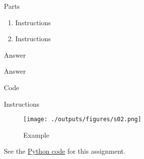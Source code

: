 


%
%

\newcommand{\hmwkTitle}{HW00}
\newcommand{\hmwkSubTitle}{Homework Template}
\newcommand{\hmwkDueDate}{September 25th. 2025}
\newcommand{\hmwkDueTime}{09:30 AM}
\newcommand{\hmwkClass}{ENAE 441 - 0101}
\newcommand{\hmwkClassTime}{09:30 AM}
\newcommand{\hmwkClassInstructor}{Dr. Martin}
\newcommand{\hmwkAuthorName}{\textbf{Vai Srivastava}}
\newcommand{\hmwkCompletionDate}{\today}



\maketitle

\pagebreak

\begin{hwkProblem}{1}{Parts} \label{hwk:p01}

	\begin{enumerate}[label=(\alph*)]
		\item \label{hwk:p01a} Instructions
		\item \label{hwk:p01b} Instructions
	\end{enumerate}

	\hwkSol{} \label{hwk:s01}

	\hwkPart{} \label{hwk:s01a}

	Answer

	\hwkPart{} \label{hwk:s01b}

	Answer

\end{hwkProblem}

\begin{hwkProblem}{2}{Code} \label{hwk:p02}

	Instructions

	\hwkSol{} \label{hwk:s02}

	\begin{figure}[H] \label{fig:s02}
		\begin{center}
			\texttt{[image: ./outputs/figures/s02.png]}
		\end{center}
		\caption{Example}
	\end{figure}

	\hwkCode{} \label{code:s02}

	See the \href{https://www.github.com/vaisriv/enae441-hw-template/blob/main/code/hw00.py}{Python code} for this assignment.

\end{hwkProblem}


